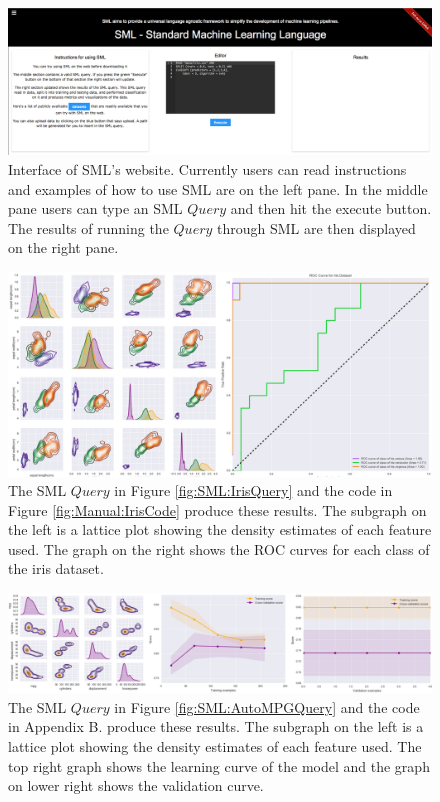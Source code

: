 \begin{figure}
\includegraphics[width=1\textwidth]{figures/SML/sml-web-site.png}
\centering
\caption{Interface of SML's website. Currently users can read instructions and examples of how to use SML are on the left pane. In the middle pane users can type an SML \(Query\) and then hit the execute button. The results of running the \(Query\) through SML are then displayed on the right pane.\\}
\label{fig:SML:website}
\end{figure}


\begin{figure}
\includegraphics[width=1\textwidth]{figures/SML/iris_results.png}
\centering
\caption{The SML \(Query\) in Figure \ref{fig:SML:IrisQuery} and the code in Figure \ref{fig:Manual:IrisCode} produce these results. The subgraph on the left is a lattice plot showing the density estimates of each feature used. The graph on the right shows the ROC curves for each class of the iris dataset.\\}
\label{fig:IrisResults}
\end{figure}

\begin{figure}
\includegraphics[width=1\textwidth]{figures/SML/auto-mpg-results.png}
\centering
\caption{The SML \(Query\) in Figure \ref{fig:SML:AutoMPGQuery}  and the code in Appendix B. produce these results. The subgraph on the left is a lattice plot showing the density estimates of each feature used. The top right graph shows the learning curve of the model and the graph on lower right shows the validation curve.\\}
\label{fig:AutoMPG:Results}
\end{figure}

